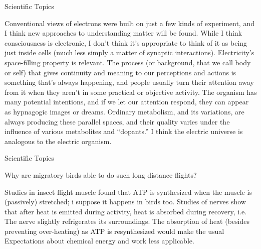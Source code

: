 \documentclass[11pt,oneside,openany,extrafontsizes]{memoir}
\begin{document}
\begin{standalonequote}{Scientific Topics}

    \begin{answer}
        Conventional views of electrons were built on just a few kinds of experiment, and I think new approaches to understanding matter will be found. While I think consciousness is electronic, I don't think it's appropriate to think of it as being just inside cells (much less simply a matter of synaptic interactions). Electricity's space-filling property is relevant. The process (or background, that we call body or self) that gives continuity and meaning to our perceptions and actions is something that's always happening, and people usually turn their attention away from it when they aren't in some practical or objective activity. The organism has many potential intentions, and if we let our attention respond, they can appear as hypnagogic images or dreams. Ordinary metabolism, and its variations, are always producing these parallel spaces, and their quality varies under the influence of various metabolites and \enquote{dopants.} I think the electric universe is analogous to the electric organism.
    \end{answer}
\end{standalonequote}

\begin{qaexchange}{Scientific Topics}

    \begin{question}
        Why are migratory birds able to do such long distance flights?
    \end{question}

    \begin{answer}
        Studies in insect flight muscle found that ATP is synthesized when the muscle is (passively) stretched; i suppose it happens in birds too. Studies of nerves show that after heat is emitted during activity, heat is absorbed during recovery, i.e. The nerve slightly refrigerates its surroundings. The absorption of heat (besides preventing over-heating) as ATP is resynthesized would make the usual Expectations about chemical energy and work less applicable.
    \end{answer}
\end{qaexchange}
\end{document}
